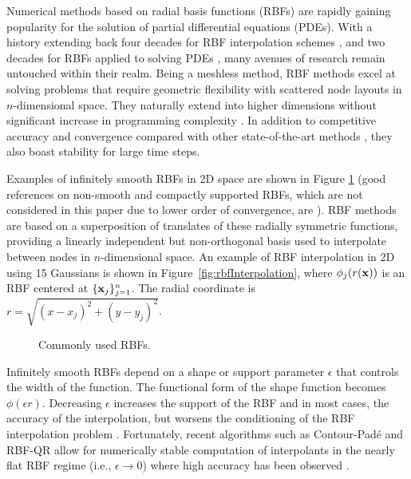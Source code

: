 Numerical methods based on radial basis functions (RBFs) are rapidly gaining popularity for the solution of partial differential equations (PDEs). With a history extending back four decades for RBF interpolation schemes \cite{Hardy1971}, and two decades for RBFs applied to solving PDEs \cite{Kansa1990a}, many avenues of research remain untouched within their realm. Being a meshless method, RBF methods excel at solving problems that require geometric flexibility with scattered node layouts in $n$-dimensional space. They naturally extend into higher dimensions without significant increase in programming complexity \cite{FlyerWright07,WrightFlyerYuen10}. In addition to competitive accuracy and convergence compared with other state-of-the-art methods \cite{FlyerWright07, FlyerWright09, FlyerLehto10, WrightFlyerYuen10, FlyerFornberg11}, they also boast stability for large time steps.

Examples of infinitely smooth RBFs in 2D space are shown in Figure \ref{fig:rbfs} (good references on non-smooth and compactly supported RBFs, which are not considered in this paper due to lower order of convergence, are \cite{BuhmannBook,WendlandBook}). RBF methods are based on a superposition of translates of these radially symmetric functions, providing a linearly independent but non-orthogonal basis used to interpolate between nodes in $n$-dimensional space. An example of RBF interpolation in 2D using 15 Gaussians is shown in Figure~\ref{fig:rbfInterpolation}, where 
   $\phi_j(r(\mathbf{x}))$
is an RBF centered at $\{\mathbf{x}_j\}_{j=1}^{n}$. 
   The radial coordinate is $r = \sqrt{(x-x_j)^2 + (y-y_j)^2}$.

\begin{figure}[ht]
    \centering
    \caption{Commonly used RBFs.}
    \label{fig:rbfs}
\end{figure}

Infinitely smooth RBFs depend on a shape or support parameter $\epsilon$ that controls the width of the function. The functional form of the shape function becomes $\phi(\epsilon r)$. Decreasing $\epsilon$ increases the support of the RBF and in most cases, the accuracy of the interpolation, but worsens the conditioning of the RBF interpolation problem \cite{Schaback1995}. Fortunately, recent algorithms such as Contour-Pad\'{e} \cite{Fornberg2004} and RBF-QR \cite{Fornberg2007, Fornberg2011a} allow for numerically stable computation of interpolants in the nearly flat RBF regime (i.e., $\epsilon \rightarrow 0$) where high accuracy has been observed \cite{Larsson2003, Fornberg2008}.


